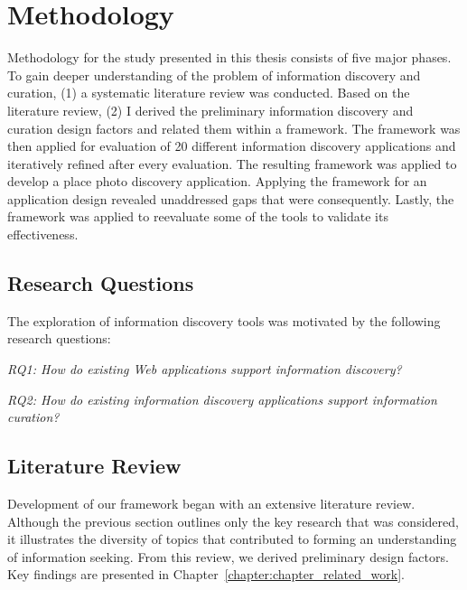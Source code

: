 \chapter{Methodology}
\label{chapter:methodology}

Methodology for the study presented in this thesis consists of five major phases. To gain deeper understanding of the problem of information discovery and curation, (1) a systematic literature review was conducted. Based on the literature review, (2) I derived the preliminary information discovery and curation design factors and related them within a framework. The framework was then applied for evaluation of 20 different information discovery applications and iteratively refined after every evaluation. The resulting framework was applied to develop a place photo discovery application. Applying the framework for an application design revealed unaddressed gaps that were consequently. Lastly, the framework was applied to reevaluate some of the tools to validate its effectiveness.  

{\section{Research Questions}
The exploration of information discovery tools was motivated by the following research questions:

\emph{RQ1: How do existing Web applications support information discovery?}

\emph{RQ2: How do existing information discovery applications support information curation?}
}%

{\section{Literature Review}
Development of our framework began with an extensive literature review. Although the previous section outlines only the key research that was considered, it illustrates the diversity of topics that contributed to forming an understanding of information seeking. From this review, we derived preliminary design factors. Key findings are presented in Chapter~\ref{chapter:chapter_related_work}.
}%

